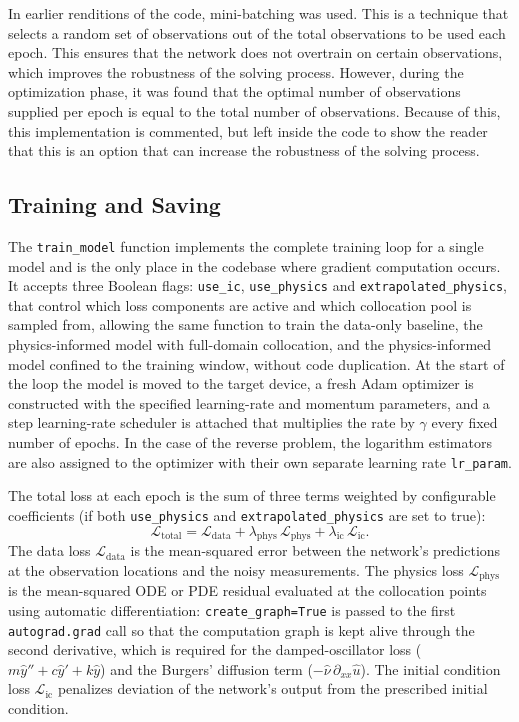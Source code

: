\documentclass[12pt, a4paper]{report}
\begin{document}
In earlier renditions of the code, mini-batching was used. This is a technique that selects a random set of observations out of the total observations to be used each epoch. This ensures that the network does not overtrain on certain observations, which improves the robustness of the solving process. However, during the optimization phase, it was found that the optimal number of observations supplied per epoch is equal to the total number of observations. Because of this, this implementation is commented, but left inside the code to show the reader that this is an option that can increase the robustness of the solving process.

\subsection{Training and Saving}
The \verb|train_model| function implements the complete training loop for a single model and is the only place in the codebase where gradient computation occurs. It accepts three Boolean flags: \verb|use_ic|, \verb|use_physics| and \verb|extrapolated_physics|, that control which loss components are active and which collocation pool is sampled from, allowing the same function to train the data-only baseline, the physics-informed model with full-domain collocation, and the physics-informed model confined to the training window, without code duplication. At the start of the loop the model is moved to the target device, a fresh Adam optimizer is constructed with the specified learning-rate and momentum parameters, and a step learning-rate scheduler is attached that multiplies the rate by $\gamma$ every fixed number of epochs. In the case of the reverse problem, the logarithm estimators are also assigned to the optimizer with their own separate learning rate \verb|lr_param|.

The total loss at each epoch is the sum of three terms weighted by configurable coefficients (if both \verb|use_physics| and \verb|extrapolated_physics| are set to true):
\[
  \mathcal{L}_\text{total} = \mathcal{L}_\text{data} + \lambda_\text{phys}\,\mathcal{L}_\text{phys} + \lambda_\text{ic}\,\mathcal{L}_\text{ic}.
\]
The data loss $\mathcal{L}_\text{data}$ is the mean-squared error between the network's predictions at the observation locations and the noisy measurements. The physics loss $\mathcal{L}_\text{phys}$ is the mean-squared ODE or PDE residual evaluated at the collocation points using automatic differentiation: \verb|create_graph=True| is passed to the first \verb|autograd.grad| call so that the computation graph is kept alive through the second derivative, which is required for the damped-oscillator loss ($m\hat{y}'' + c\hat{y}' + k\hat{y}$) and the Burgers' diffusion term ($-\hat{\nu}\,\partial_{xx}\hat{u}$). The initial condition loss $\mathcal{L}_\text{ic}$ penalizes deviation of the network's output from the prescribed initial condition.
\end{document}
